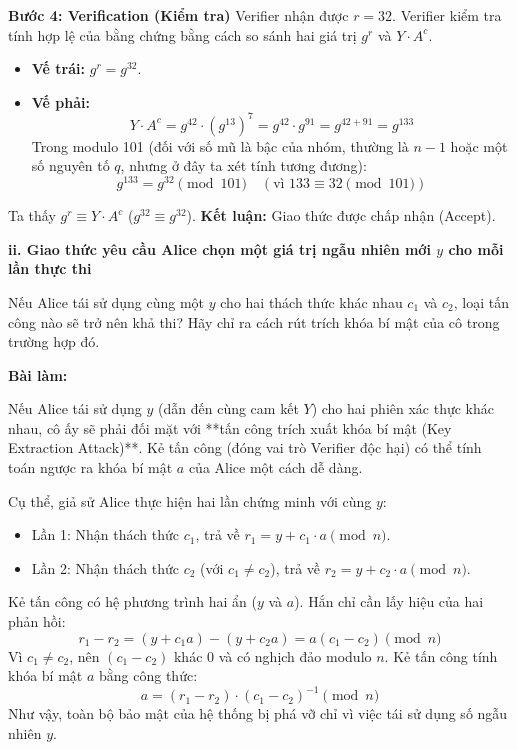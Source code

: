 \textbf{Bước 4: Verification (Kiểm tra)}
Verifier nhận được $r = 32$. Verifier kiểm tra tính hợp lệ của bằng chứng bằng cách so sánh hai giá trị $g^r$ và $Y \cdot A^c$.

\begin{itemize}
    \item \textbf{Vế trái:} $g^r = g^{32}$.
    \item \textbf{Vế phải:}
    \[
    Y \cdot A^c = g^{42} \cdot (g^{13})^7 = g^{42} \cdot g^{91} = g^{42 + 91} = g^{133}
    \]
    Trong modulo 101 (đối với số mũ là bậc của nhóm, thường là $n-1$ hoặc một số nguyên tố $q$, nhưng ở đây ta xét tính tương đương):
    \[
    g^{133} = g^{32} \pmod{101} \quad (\text{vì } 133 \equiv 32 \pmod{101})
    \]
\end{itemize}
Ta thấy $g^r \equiv Y \cdot A^c$ ($g^{32} \equiv g^{32}$).
\textbf{Kết luận:} Giao thức được chấp nhận (Accept).

\textbf{ii. Giao thức yêu cầu Alice chọn một giá trị ngẫu nhiên mới $y$ cho mỗi lần thực thi}

Nếu Alice tái sử dụng cùng một $y$ cho hai thách thức khác nhau $c_1$ và $c_2$, loại tấn công nào sẽ trở nên khả thi?
Hãy chỉ ra cách rút trích khóa bí mật của cô trong trường hợp đó.

\textbf{Bài làm:}

Nếu Alice tái sử dụng $y$ (dẫn đến cùng cam kết $Y$) cho hai phiên xác thực khác nhau, cô ấy sẽ phải đối mặt với **tấn công trích xuất khóa bí mật (Key Extraction Attack)**. Kẻ tấn công (đóng vai trò Verifier độc hại) có thể tính toán ngược ra khóa bí mật $a$ của Alice một cách dễ dàng.

Cụ thể, giả sử Alice thực hiện hai lần chứng minh với cùng $y$:
\begin{itemize}
    \item Lần 1: Nhận thách thức $c_1$, trả về $r_1 = y + c_1 \cdot a \pmod{n}$.
    \item Lần 2: Nhận thách thức $c_2$ (với $c_1 \neq c_2$), trả về $r_2 = y + c_2 \cdot a \pmod{n}$.
\end{itemize}

Kẻ tấn công có hệ phương trình hai ẩn ($y$ và $a$). Hắn chỉ cần lấy hiệu của hai phản hồi:
\[
r_1 - r_2 = (y + c_1 a) - (y + c_2 a) = a(c_1 - c_2) \pmod{n}
\]
Vì $c_1 \neq c_2$, nên $(c_1 - c_2)$ khác 0 và có nghịch đảo modulo $n$. Kẻ tấn công tính khóa bí mật $a$ bằng công thức:
\[
a = (r_1 - r_2) \cdot (c_1 - c_2)^{-1} \pmod{n}
\]
Như vậy, toàn bộ bảo mật của hệ thống bị phá vỡ chỉ vì việc tái sử dụng số ngẫu nhiên $y$.

